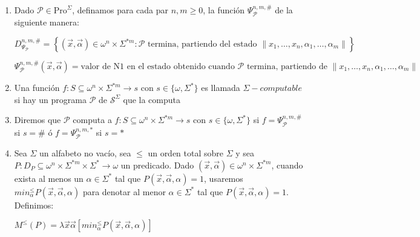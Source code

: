 \documentclass{article}
\begin{document}
\begin{enumerate}
    \item Dado $\mathcal{P} \in \text{Pro}^{\Sigma}$, definamos para cada
    par $n, m \geq 0$, la función $\Psi_{\mathcal{P}}^{n, m, \#}$ de la siguiente 
    manera:

    \begin{center}
        $D^{n,m,\#}_{\Psi_{\mathcal{P}}} = \left\{ (\vec{x}, \vec{\alpha}) \in \omega^n \times \Sigma^{*m} : \mathcal{P} \text{ termina, partiendo del estado } \parallel x_1, \ldots, x_n, \alpha_1, \ldots, \alpha_m \parallel \right\}$
    \end{center}
    
    \begin{center}
        $\Psi^{n,m,\#}_{\mathcal{P}}(\vec{x}, \vec{\alpha}) = \text{valor de N1 en el estado obtenido cuando } \mathcal{P} \text{ termina, partiendo de } \parallel x_1, \ldots, x_n, \alpha_1, \ldots, \alpha_m \parallel$
    \end{center}

    \item Una función $f : S \subseteq \omega^n \times \Sigma^{*m}
    \rightarrow s$ con $s \in \{\omega, \Sigma^{*}\}$ es llamada $\Sigma-computable$ si hay un programa
    $\mathcal{P}$ de $\mathcal{S}^{\Sigma}$ que la computa

    \item Diremos que $\mathcal{P}$ computa a $f : S \subseteq \omega^n \times \Sigma^{*m}
    \rightarrow s$ con $s \in \{\omega, \Sigma^{*}\}$ si 
    $f = \Psi_{\mathcal{P}}^{n, m, \#}$ si $s = \#$ ó 
    $f = \Psi_{\mathcal{P}}^{n, m, *}$ si $s = *$

    \item Sea $\Sigma$ un alfabeto no vacío, sea $\leq$ un orden total sobre $\Sigma$
     y sea $P : D_P 
    \subseteq \omega^{n} \times \Sigma^{*m} \times \Sigma^{*} \rightarrow \omega$ un predicado.
    Dado $(\overset{\rightarrow}{x}, \overset{\rightarrow}{\alpha})
    \in \omega^n \times \Sigma^{*m}$, cuando exista al menos un $\alpha \in \Sigma^{*}$ tal que
    $P(\overset{\rightarrow}{x}, \overset{\rightarrow}{\alpha}, \alpha) = 1$, 
    usaremos $min_\alpha^{\leq} P(\overset{\rightarrow}{x}, \overset{\rightarrow}{\alpha}, \alpha)$ para
    denotar al menor $\alpha \in \Sigma^{*}$
    tal que $P(\overset{\rightarrow}{x}, \overset{\rightarrow}{\alpha}, \alpha) = 1$. Definimos:
    \begin{center}
        $M^{\leq}(P) = \lambda\overset{\rightarrow}{x} \overset{\rightarrow}{\alpha}
        [min_\alpha^{\leq} P(\overset{\rightarrow}{x}, \overset{\rightarrow}{\alpha}, \alpha)]$
    \end{center}

\end{enumerate}
\end{document}
